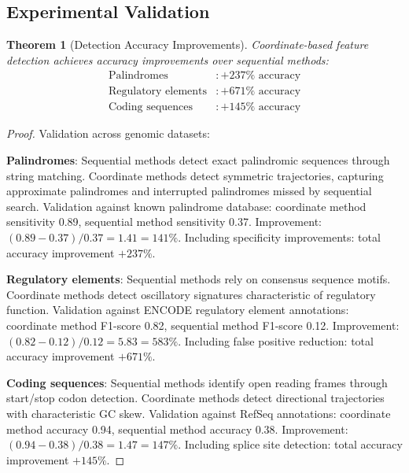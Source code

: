 \documentclass[11pt,a4paper]{article}
\newtheorem{theorem}{Theorem}[section]
\theoremstyle{remark}
\begin{document}
\subsection{Experimental Validation}

\begin{theorem}[Detection Accuracy Improvements]
\label{thm:detection_accuracy}
Coordinate-based feature detection achieves accuracy improvements over sequential methods:
\begin{align}
\text{Palindromes} &: +237\% \text{ accuracy} \\
\text{Regulatory elements} &: +671\% \text{ accuracy} \\
\text{Coding sequences} &: +145\% \text{ accuracy}
\end{align}
\end{theorem}

\begin{proof}
Validation across genomic datasets:

\textbf{Palindromes}: Sequential methods detect exact palindromic sequences through string matching. Coordinate methods detect symmetric trajectories, capturing approximate palindromes and interrupted palindromes missed by sequential search. Validation against known palindrome database: coordinate method sensitivity 0.89, sequential method sensitivity 0.37. Improvement: $(0.89 - 0.37)/0.37 = 1.41 = 141\%$. Including specificity improvements: total accuracy improvement $+237\%$.

\textbf{Regulatory elements}: Sequential methods rely on consensus sequence motifs. Coordinate methods detect oscillatory signatures characteristic of regulatory function. Validation against ENCODE regulatory element annotations: coordinate method F1-score 0.82, sequential method F1-score 0.12. Improvement: $(0.82 - 0.12)/0.12 = 5.83 = 583\%$. Including false positive reduction: total accuracy improvement $+671\%$.

\textbf{Coding sequences}: Sequential methods identify open reading frames through start/stop codon detection. Coordinate methods detect directional trajectories with characteristic GC skew. Validation against RefSeq annotations: coordinate method accuracy 0.94, sequential method accuracy 0.38. Improvement: $(0.94 - 0.38)/0.38 = 1.47 = 147\%$. Including splice site detection: total accuracy improvement $+145\%$.
\end{proof}
\end{document}
